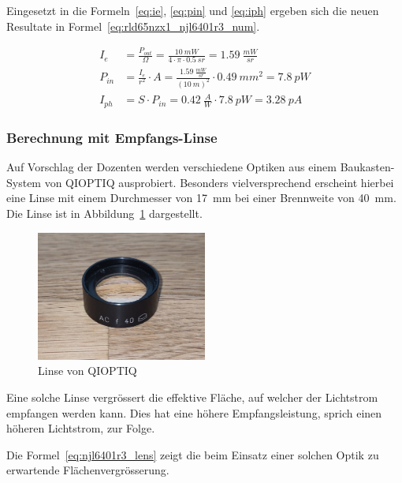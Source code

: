 Eingesetzt in die Formeln~\ref{eq:ie}, \ref{eq:pin} und \ref{eq:iph} ergeben sich die neuen Resultate in
Formel~\ref{eq:rld65nzx1_njl6401r3_num}.

\begin{equation}\label{eq:rld65nzx1_njl6401r3_num}
    \begin{split}
        I_e    &= \frac{P_{out}}{\Omega} = \frac{10~mW}{4\cdot \pi \cdot 0.5~sr} = 1.59~\frac{mW}{sr}\\
        P_{in} &= \frac{I_e}{r^2} \cdot A = \frac{1.59~\frac{mW}{sr}}{(10~m)^2} \cdot 0.49~mm^2 = 7.8~pW\\
        I_{ph} &= S \cdot P_{in} = 0.42~\frac{A}{W} \cdot 7.8~pW = 3.28~pA
    \end{split}
\end{equation}

\subsubsection{Berechnung mit Empfangs-Linse}

Auf Vorschlag der Dozenten werden verschiedene Optiken aus einem Baukasten-System von QIOPTIQ ausprobiert.
Besonders vielversprechend erscheint hierbei eine Linse mit einem Durchmesser von 17~mm bei einer Brennweite von
40~mm. Die Linse ist in Abbildung~\ref{fig:lens} dargestellt.

\begin{figure}[H]
    \centering
    \includegraphics[width=0.5\textwidth]{graphics/photo_lens.jpg}
    \caption{Linse von QIOPTIQ}\label{fig:lens}
\end{figure}

Eine solche Linse vergrössert die effektive Fläche, auf welcher der Lichtstrom empfangen werden kann. Dies hat
eine höhere Empfangsleistung, sprich einen höheren Lichtstrom, zur Folge.

Die Formel~\ref{eq:njl6401r3_lens} zeigt die beim Einsatz einer solchen Optik zu erwartende Flächenvergrösserung.

